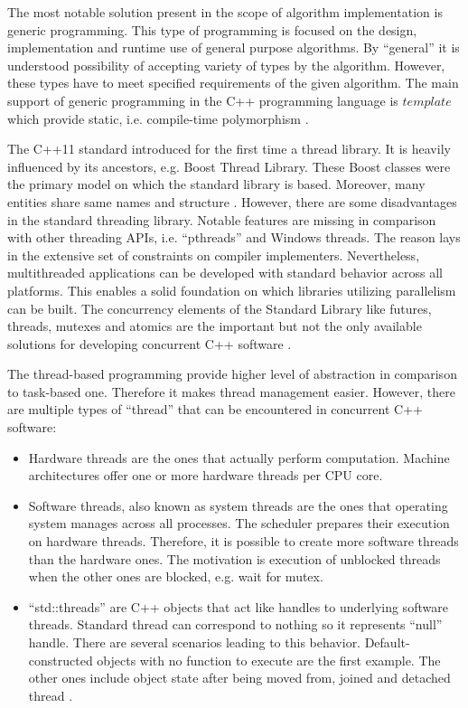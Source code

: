 The most notable solution present in the scope of algorithm implementation is generic programming.
This type of programming is focused on the design, implementation and runtime use of general purpose
algorithms. By ``general'' it is understood possibility of accepting variety of types by the algorithm.
However, these types have to meet specified requirements of the given algorithm. The main support
of generic programming in the C++ programming language is $template$ which provide static,
i.e. compile-time polymorphism \cite{cpp_language_bjarne}.

The C++11 standard introduced for the first time a thread library. It is heavily
influenced by its ancestors, e.g. Boost Thread Library. These Boost classes were the primary model
on which the standard library is based. Moreover, many entities share same names and structure \cite{cpp_concurrency}.
However, there are some disadvantages in the standard threading library. Notable features are
missing in comparison with other threading APIs, i.e. ``pthreads'' and Windows threads.
The reason lays in the extensive set of constraints on compiler implementers. Nevertheless,
multithreaded applications can be developed with standard behavior across all platforms.
This enables a solid foundation on which libraries utilizing parallelism can be built.
The concurrency elements of the Standard Library like futures, threads, mutexes and atomics
are the important but not the only available solutions for developing concurrent C++ software \cite{cpp_meyers}.

The thread-based programming provide higher level of abstraction in comparison to task-based one.
Therefore it makes thread management easier. However, there are multiple types of ``thread''
that can be encountered in concurrent C++ software:
\begin{itemize}
    \item Hardware threads are the ones that actually perform computation. Machine architectures
    offer one or more hardware threads per CPU core.
    \item Software threads, also known as system threads are the ones that operating system manages
    across all processes. The scheduler prepares their execution on hardware threads. Therefore, it
    is possible to create more software threads than the hardware ones. The motivation is execution
    of unblocked threads when the other ones are blocked, e.g. wait for mutex.
    \item ``std::threads'' are C++ objects that act like handles to underlying software threads.
    Standard thread can correspond to nothing so it represents ``null'' handle. There are several scenarios
    leading to this behavior. Default-constructed objects with no function to execute are the first
    example. The other ones include object state after being moved from, joined and detached thread \cite{cpp_meyers}.
\end{itemize}

